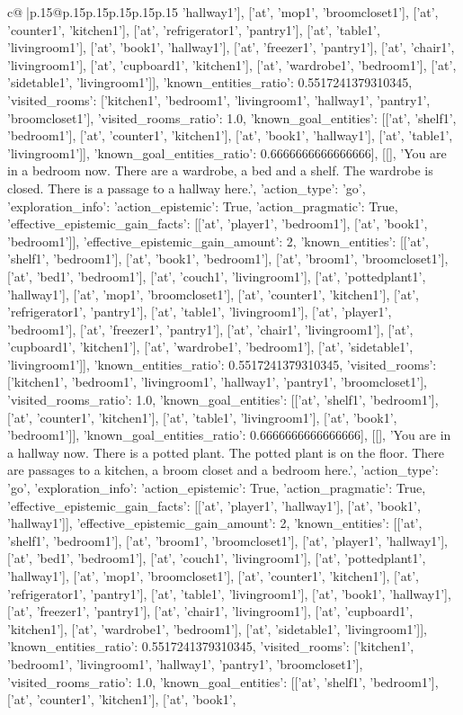 \documentclass{article}
\begin{document}
{\begin{supertabular}{c@{$\;$}|p{.15\linewidth}@{}p{.15\linewidth}p{.15\linewidth}p{.15\linewidth}p{.15\linewidth}p{.15\linewidth}}
{{{'hallway1'], ['at', 'mop1', 'broomcloset1'], ['at', 'counter1', 'kitchen1'], ['at', 'refrigerator1', 'pantry1'], ['at', 'table1', 'livingroom1'], ['at', 'book1', 'hallway1'], ['at', 'freezer1', 'pantry1'], ['at', 'chair1', 'livingroom1'], ['at', 'cupboard1', 'kitchen1'], ['at', 'wardrobe1', 'bedroom1'], ['at', 'sidetable1', 'livingroom1']], 'known_entities_ratio': 0.5517241379310345, 'visited_rooms': ['kitchen1', 'bedroom1', 'livingroom1', 'hallway1', 'pantry1', 'broomcloset1'], 'visited_rooms_ratio': 1.0, 'known_goal_entities': [['at', 'shelf1', 'bedroom1'], ['at', 'counter1', 'kitchen1'], ['at', 'book1', 'hallway1'], ['at', 'table1', 'livingroom1']], 'known_goal_entities_ratio': 0.6666666666666666}}], [[], 'You are in a bedroom now. There are a wardrobe, a bed and a shelf. The wardrobe is closed. There is a passage to a hallway here.', {'action_type': 'go', 'exploration_info': {'action_epistemic': True, 'action_pragmatic': True, 'effective_epistemic_gain_facts': [['at', 'player1', 'bedroom1'], ['at', 'book1', 'bedroom1']], 'effective_epistemic_gain_amount': 2, 'known_entities': [['at', 'shelf1', 'bedroom1'], ['at', 'book1', 'bedroom1'], ['at', 'broom1', 'broomcloset1'], ['at', 'bed1', 'bedroom1'], ['at', 'couch1', 'livingroom1'], ['at', 'pottedplant1', 'hallway1'], ['at', 'mop1', 'broomcloset1'], ['at', 'counter1', 'kitchen1'], ['at', 'refrigerator1', 'pantry1'], ['at', 'table1', 'livingroom1'], ['at', 'player1', 'bedroom1'], ['at', 'freezer1', 'pantry1'], ['at', 'chair1', 'livingroom1'], ['at', 'cupboard1', 'kitchen1'], ['at', 'wardrobe1', 'bedroom1'], ['at', 'sidetable1', 'livingroom1']], 'known_entities_ratio': 0.5517241379310345, 'visited_rooms': ['kitchen1', 'bedroom1', 'livingroom1', 'hallway1', 'pantry1', 'broomcloset1'], 'visited_rooms_ratio': 1.0, 'known_goal_entities': [['at', 'shelf1', 'bedroom1'], ['at', 'counter1', 'kitchen1'], ['at', 'table1', 'livingroom1'], ['at', 'book1', 'bedroom1']], 'known_goal_entities_ratio': 0.6666666666666666}}], [[], 'You are in a hallway now. There is a potted plant. The potted plant is on the floor. There are passages to a kitchen, a broom closet and a bedroom here.', {'action_type': 'go', 'exploration_info': {'action_epistemic': True, 'action_pragmatic': True, 'effective_epistemic_gain_facts': [['at', 'player1', 'hallway1'], ['at', 'book1', 'hallway1']], 'effective_epistemic_gain_amount': 2, 'known_entities': [['at', 'shelf1', 'bedroom1'], ['at', 'broom1', 'broomcloset1'], ['at', 'player1', 'hallway1'], ['at', 'bed1', 'bedroom1'], ['at', 'couch1', 'livingroom1'], ['at', 'pottedplant1', 'hallway1'], ['at', 'mop1', 'broomcloset1'], ['at', 'counter1', 'kitchen1'], ['at', 'refrigerator1', 'pantry1'], ['at', 'table1', 'livingroom1'], ['at', 'book1', 'hallway1'], ['at', 'freezer1', 'pantry1'], ['at', 'chair1', 'livingroom1'], ['at', 'cupboard1', 'kitchen1'], ['at', 'wardrobe1', 'bedroom1'], ['at', 'sidetable1', 'livingroom1']], 'known_entities_ratio': 0.5517241379310345, 'visited_rooms': ['kitchen1', 'bedroom1', 'livingroom1', 'hallway1', 'pantry1', 'broomcloset1'], 'visited_rooms_ratio': 1.0, 'known_goal_entities': [['at', 'shelf1', 'bedroom1'], ['at', 'counter1', 'kitchen1'], ['at', 'book1', }}}
\end{supertabular}}
\end{document}
